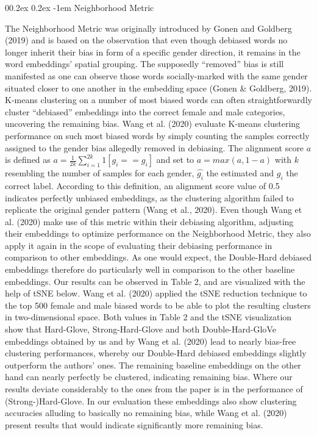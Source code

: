 \documentclass[
  english,
  man,floatsintext]{apa6}
\makeatletter
\let\oldparagraph\paragraph
\renewcommand{\paragraph}[1]{\oldparagraph{#1}\mbox{}}
\renewcommand{\paragraph}{\@startsection{paragraph}{4}{\parindent}%
  {0\baselineskip \@plus 0.2ex \@minus 0.2ex}%
  {-1em}%
  {\normalfont\normalsize\bfseries\itshape\typesectitle}}
\makeatother
\begin{document}
\hypertarget{neighborhood-metric}{%
\paragraph{Neighborhood Metric}\label{neighborhood-metric}}

The Neighborhood Metric was originally introduced by Gonen and Goldberg (2019) and is based on the observation that even though debiased words no longer inherit their bias in form of a specific gender direction, it remains in the word embeddings' spatial grouping. The supposedly ``removed'' bias is still manifested as one can observe those words socially-marked with the same gender situated closer to one another in the embedding space (Gonen \& Goldberg, 2019).
K-means clustering on a number of most biased words can often straightforwardly cluster ``debiased'' embeddings into the correct female and male categories, uncovering the remaining bias.
Wang et al. (2020) evaluate K-means clustering performance on such most biased words by simply counting the samples correctly assigned to the gender bias allegedly removed in debiasing. The alignment score \(a\) is defined as \(a = \frac{1}{2k}\sum_{i=1}^{2k}1[\hat{g_{i}}== g_{i}]\) and set to \(a = max(a, 1-a)\) with \(k\) resembling the number of samples for each gender, \(\hat{g_{i}}\) the estimated and \(g_{i}\) the correct label. According to this definition, an alignment score value of 0.5 indicates perfectly unbiased embeddings, as the clustering algorithm failed to replicate the original gender pattern (Wang et al., 2020).
Even though Wang et al. (2020) make use of this metric within their debiasing algorithm, adjusting their embeddings to optimize performance on the Neighborhood Metric, they also apply it again in the scope of evaluating their debiasing performance in comparison to other embeddings. As one would expect, the Double-Hard debiased embeddings therefore do particularly well in comparison to the other baseline embeddings.
Our results can be observed in Table 2, and are visualized with the help of tSNE below. Wang et al. (2020) applied the tSNE reduction technique to the top 500 female and male biased words to be able to plot the resulting clusters in two-dimensional space. Both values in Table 2 and the tSNE visualization show that Hard-Glove, Strong-Hard-Glove and both Double-Hard-GloVe embeddings obtained by us and by Wang et al. (2020) lead to nearly bias-free clustering performances, whereby our Double-Hard debiased embeddings slightly outperform the authors' ones. The remaining baseline embeddings on the other hand can nearly perfectly be clustered, indicating remaining bias.
Where our results deviate considerably to the ones from the paper is in the performance of (Strong-)Hard-Glove. In our evaluation these embeddings also show clustering accuracies alluding to basically no remaining bias, while Wang et al. (2020) present results that would indicate significantly more remaining bias.
\end{document}
